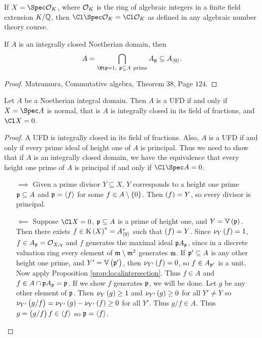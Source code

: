 \begin{remark*}
If $ X = \Spec \OOO_K $, where $ \mathcal{O}_K $ is the ring of algebraic integers in a finite field extension $ K / \mathbb{Q} $, then $ \Cl \Spec \OOO_K = \Cl \OOO_K $ as defined in any algebraic number theory course.
\end{remark*}

\begin{proposition}
\label{prop:localintersection}
If $ A $ is an integrally closed Noetherian domain, then
$$ A = \bigcap_{\Ht \ppp = 1, \ \ppp \subseteq A \ \text{prime}} A_\ppp \subseteq A_{\abr{0}}. $$
\end{proposition}

\begin{proof}
Matsumura, Commutative algebra, Theorem $ 38 $, Page $ 124 $.
\end{proof}

\begin{theorem}
Let $ A $ be a Noetherian integral domain. Then $ A $ is a UFD if and only if $ X = \Spec A $ is normal, that is $ A $ is integrally closed in its field of fractions, and $ \Cl X = 0 $.
\end{theorem}

\begin{proof}
A UFD is integrally closed in its field of fractions. Also, $ A $ is a UFD if and only if every prime ideal of height one of $ A $ is principal. Thus we need to show that if $ A $ is an integrally closed domain, we have the equivalence that every height one prime of $ A $ is principal if and only if $ \Cl \Spec A = 0 $.
\begin{itemize}
\item[$ \implies $] Given a prime divisor $ Y \subseteq X $, $ Y $ corresponds to a height one prime $ \mathfrak{p} \subseteq A $ and $ \mathfrak{p} = \left\langle f \right\rangle $ for some $ f \in A \setminus \cbr{0} $. Then $ \br{f} = Y $, so every divisor is principal.
\item[$ \impliedby $] Suppose $ \Cl X = 0 $, $ \mathfrak{p} \subseteq A $ is a prime of height one, and $ Y = \VV\br{\ppp} $. Then there exists $ f \in \K\br{X}^* = A_{\abr{0}}^* $ such that $ \br{f} = Y $. Since $ \nu_Y\br{f} = 1 $, $ f \in A_{\mathfrak{p}} = \mathcal{O}_{X, \eta} $ and $ f $ generates the maximal ideal $ \mathfrak{p} A_{\mathfrak{p}} $, since in a discrete valuation ring every element of $ \mathfrak{m} \setminus \mathfrak{m}^2 $ generates $ \mathfrak{m} $. If $ \mathfrak{p}' \subseteq A $ is any other height one prime, and $ Y' = \VV\br{\ppp'} $, then $ \nu_{Y'}\br{f} = 0 $, so $ f \in A_{\mathfrak{p}'} $ is a unit. Now apply Proposition \ref{prop:localintersection}. Thus $ f \in A $ and $ f \in A \cap \mathfrak{p} A_{\mathfrak{p}} = \mathfrak{p} $. If we show $ f $ generates $ \mathfrak{p} $, we will be done. Let $ g $ be any other element of $ \mathfrak{p} $. Then $ \nu_Y\br{g} \ge 1 $ and $ \nu_{Y'}\br{g} \ge 0 $ for all $ Y' \ne Y $ so $ \nu_{Y'}\br{g / f} = \nu_{Y'}\br{g} - \nu_{Y'}\br{f} \ge 0 $ for all $ Y' $. Thus $ g / f \in A $. Thus $ g = \br{g / f}f \in \abr{f} $ so $ \mathfrak{p} = \left\langle f \right\rangle $.
\end{itemize}
\end{proof}

